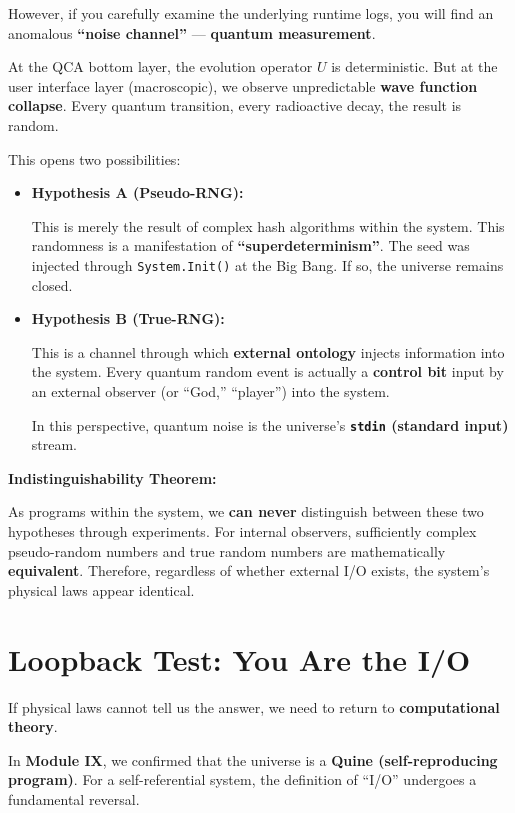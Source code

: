However, if you carefully examine the underlying runtime logs, you will find an anomalous \textbf{``noise channel''} --- \textbf{quantum measurement}.

At the QCA bottom layer, the evolution operator \textbf{$U$} is deterministic. But at the user interface layer (macroscopic), we observe unpredictable \textbf{wave function collapse}. Every quantum transition, every radioactive decay, the result is random.

This opens two possibilities:

\begin{itemize}
\item \textbf{Hypothesis A (Pseudo-RNG):}

This is merely the result of complex hash algorithms within the system. This randomness is a manifestation of \textbf{``superdeterminism''}. The seed was injected through \texttt{System.Init()} at the Big Bang. If so, the universe remains closed.

\item \textbf{Hypothesis B (True-RNG):}

This is a channel through which \textbf{external ontology} injects information into the system. Every quantum random event is actually a \textbf{control bit} input by an external observer (or ``God,'' ``player'') into the system.

In this perspective, quantum noise is the universe's \textbf{\texttt{stdin} (standard input)} stream.
\end{itemize}

\textbf{Indistinguishability Theorem:}

As programs within the system, we \textbf{can never} distinguish between these two hypotheses through experiments. For internal observers, sufficiently complex pseudo-random numbers and true random numbers are mathematically \textbf{equivalent}. Therefore, regardless of whether external I/O exists, the system's physical laws appear identical.

\section{Loopback Test: You Are the I/O}

If physical laws cannot tell us the answer, we need to return to \textbf{computational theory}.

In \textbf{Module IX}, we confirmed that the universe is a \textbf{Quine (self-reproducing program)}. For a self-referential system, the definition of ``I/O'' undergoes a fundamental reversal.

